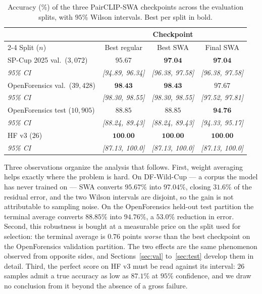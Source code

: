 \documentclass[10pt,journal]{IEEEtran}
\newcommand{\best}[1]{\textbf{#1}}
\begin{document}
\begin{table}[!t]
\caption{Accuracy (\%) of the three PairCLIP-SWA checkpoints across the
evaluation splits, with $95\%$ Wilson intervals. Best per split in bold.}
\label{tab:main}
\centering
\footnotesize
\setlength{\tabcolsep}{2.4pt}
\begin{tabular}{@{}lccc@{}}
\toprule
& \multicolumn{3}{c}{Checkpoint}\\
\cmidrule(l){2-4}
Split ($n$) & Best regular & Best SWA & Final SWA \\
\midrule
SP-Cup 2025 val.\ ($3{,}072$)
  & $95.67$ & $\best{97.04}$ & $\best{97.04}$ \\
\emph{95\% CI}
  & \emph{[94.89, 96.34]} & \emph{[96.38, 97.58]} & \emph{[96.38, 97.58]} \\[2pt]
OpenForensics val.\ ($39{,}428$)
  & $\best{98.43}$ & $\best{98.43}$ & $97.67$ \\
\emph{95\% CI}
  & \emph{[98.30, 98.55]} & \emph{[98.30, 98.55]} & \emph{[97.52, 97.81]} \\[2pt]
OpenForensics test ($10{,}905$)
  & $88.85$ & $88.85$ & $\best{94.76}$ \\
\emph{95\% CI}
  & \emph{[88.24, 89.43]} & \emph{[88.24, 89.43]} & \emph{[94.33, 95.17]} \\[2pt]
HF v3 ($26$)
  & $\best{100.00}$ & $\best{100.00}$ & $\best{100.00}$ \\
\emph{95\% CI}
  & \emph{[87.13, 100.0]} & \emph{[87.13, 100.0]} & \emph{[87.13, 100.0]} \\
\bottomrule
\end{tabular}
\end{table}

Three observations organize the analysis that follows. First, weight
averaging helps exactly where the problem is hard. On DF-Wild-Cup --- a corpus
the model has never trained on --- SWA converts $95.67\%$ into $97.04\%$,
closing $31.6\%$ of the residual error, and the two Wilson intervals are
disjoint, so the gain is not attributable to sampling noise. On the
OpenForensics held-out test partition the terminal average converts $88.85\%$
into $94.76\%$, a $53.0\%$ reduction in error. Second, this robustness is
bought at a measurable price on the split used for selection: the terminal
average is $0.76$ points \emph{worse} than the best checkpoint on the
OpenForensics validation partition. The two effects are the same phenomenon
observed from opposite sides, and Sections~\ref{sec:val} to~\ref{sec:test}
develop them in detail. Third, the perfect score on HF v3 must be read against
its interval: $26$ samples admit a true accuracy as low as $87.1\%$ at $95\%$
confidence, and we draw no conclusion from it beyond the absence of a gross
failure.
\end{document}
